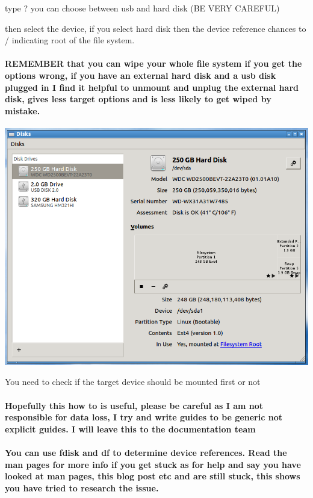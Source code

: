 \documentclass[12pt,a4paper]{book}
\begin{document}
type ? you can choose between usb and hard disk (BE VERY CAREFUL)

then select the device, if you select hard disk then the device reference chances to / indicating root of the file system.

\paragraph{REMEMBER that you can wipe your whole file system if you get the options wrong,  if you have an external hard disk and a usb disk plugged in I find it helpful to unmount and unplug the external hard disk,  gives less target options and is less likely to get wiped by mistake.}

 
\begin{center}
\includegraphics[width=0.7\linewidth]{unetbootin4}
\end{center}
You need to check if the target device should be mounted first or not


\paragraph{Hopefully this how to is useful,  please be careful as I am not responsible for data loss,  I try and write guides to be generic not explicit guides.  I will leave this to the documentation team}

\paragraph{You can use fdisk and df to determine device references. Read the man pages for more info if you get stuck as for help and say you have looked at man pages,  this blog post etc and are still stuck,  this shows you have tried to research the issue.}
\end{document}
